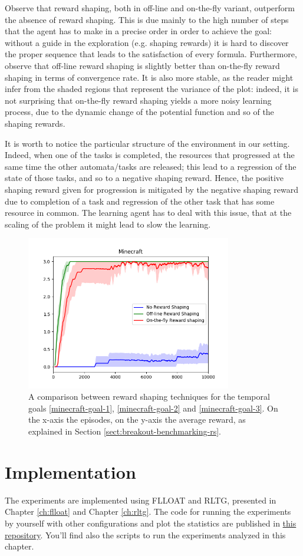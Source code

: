 Observe that reward shaping, both in off-line and on-the-fly variant, outperform the absence of reward shaping. This is due mainly to the high number of steps that the agent has to make in a precise order in order to achieve the goal: without a guide in the exploration (e.g. shaping rewards) it is hard to discover the proper sequence that leads to the satisfaction of every formula. Furthermore, observe that off-line reward shaping is slightly better than on-the-fly reward shaping in terms of convergence rate. It is also more stable, as the reader might infer from the shaded regions that represent the variance of the plot: indeed, it is not surprising that on-the-fly reward shaping yields a more noisy learning process, due to the dynamic change of the potential function and so of the shaping rewards.

It is worth to notice the particular structure of the environment in our setting. Indeed, when one of the tasks is completed, the resources that progressed at the same time the other automata/tasks are released; this lead to a regression of the state of those tasks, and so to a negative shaping reward. Hence, the positive shaping reward given for progression is mitigated by the negative shaping reward due to completion of a task and regression of the other task that has some resource in common. The learning agent has to deal with this issue, that at the scaling of the problem it might lead to slow the learning.


\begin{figure}
	\centering
	\includegraphics[width=0.8\textwidth]{images/minecraft-comparison.png}
	\caption{A comparison between reward shaping techniques for the temporal goals \ref{minecraft-goal-1}, \ref{minecraft-goal-2} and \ref{minecraft-goal-3}. On the x-axis the episodes, on the y-axis the average reward, as explained in Section \ref{sect:breakout-benchmarking-rs}.}
	\label{fig:minecraft-comparison}
\end{figure}


\section{Implementation}
The experiments are implemented using FLLOAT and RLTG, presented in Chapter \ref{ch:flloat} and Chapter \ref{ch:rltg}.
The code for running the experiments by yourself with other configurations and plot the statistics are published in \href{https://github.com/MarcoFavorito/rltg-examples}{this repository}. You'll find also the scripts to run the experiments analyzed in this chapter.
